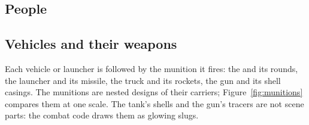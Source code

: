 
\newcommand{\tankextras}{%

\begin{table}[H]
\caption{The three tanks are one design; only the root transform differs.}\label{tab:main-tank}
\centering\footnotesize\variantsTank
\end{table}

\begin{figure}[H]
\centering\buildstripKeyTank
\caption{The tank built up in hierarchy order (depth-first order of the scene graph): hull first, then running gear,
then turret and gun.}
\label{fig:build-tank}
\end{figure}}

\newcommand{\uavextras}{%

\begin{figure}[H]
\centering\partsgridUav
\caption{Every part kind of the UAV (uncrewed aerial vehicle) (\nKindsUav{} kinds, $\times n$ = parts of that kind), each rendered alone at the
same size, with its primitive and size.}
\label{fig:parts-uav}
\end{figure}

\begin{figure}[H]
\centering\buildstripKeyUav
\caption{The UAV (uncrewed aerial vehicle) built up in hierarchy order: the first 12, 35, 65 and 100\,\% of its parts, including the rounds on
its rails.}
\label{fig:build-uav}
\end{figure}}

\newcommand{\heliextras}{%

\begin{figure}[H]
\centering\buildstripKeyHeli
\caption{The scout helicopter built up in hierarchy order: body, then the rotor heads and blades, then the searchlight.}
\label{fig:build-heli}
\end{figure}}

\newcommand{\bunkerextras}{%

\begin{figure}[H]
\centering\buildstripKeyBunker
\caption{The command bunker built up in hierarchy order: the entrance trench, the blast door, the shell, then the rooms
and the surface installations.}
\label{fig:build-bunker}
\end{figure}}

\clearpage\subsection{People}
\designcardsPeople

\clearpage\subsection{Vehicles and their weapons}
Each vehicle or launcher is followed by the munition it fires: the  and its rounds, the  launcher and its missile,
the  truck and its rockets, the  gun and its shell casings. The munitions are nested designs of their carriers;
Figure~\ref{fig:munitions} compares them at one scale. The tank's shells and the  gun's tracers are not scene parts:
the combat code draws them as glowing slugs.
\designcardsVehiclesAndTheirWeapons
\munitionlineupfig

